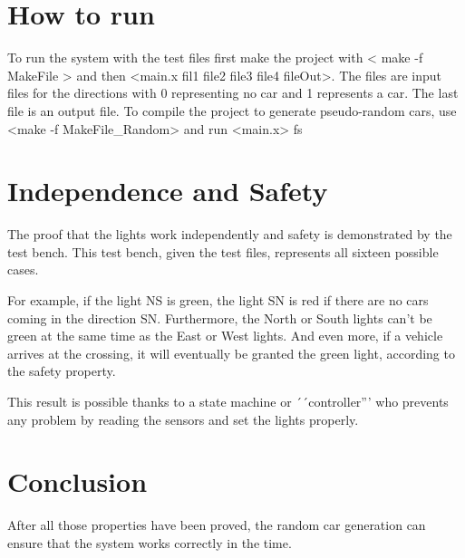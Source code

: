 
\section{How to run}
To run the system with the test files first make the project with < make -f MakeFile > and then <main.x fil1 file2 file3 file4 fileOut>. The files are input files for the directions with 0 representing no car and 1 represents a car. The last file is an output file. To compile the project to generate pseudo-random cars, use <make -f MakeFile_Random> and run <main.x> fs

\section{Independence and Safety}

The proof that the lights work independently and safety is demonstrated by the test bench. This test bench, given the test files, represents all sixteen possible cases.

For example, if the light NS is green, the light SN is red if there are no cars coming in the direction SN.
Furthermore, the North or South lights can't be green at the same time as the East or West lights.
And even more, if a vehicle arrives at the crossing, it will eventually be granted the green light, according to the safety property.

This result is possible thanks to a state machine or ´´controller''' who prevents any problem by reading the sensors and set the lights properly. 

\section{Conclusion}

After all those properties have been proved, the random car generation can ensure that the system works correctly in the time. 
